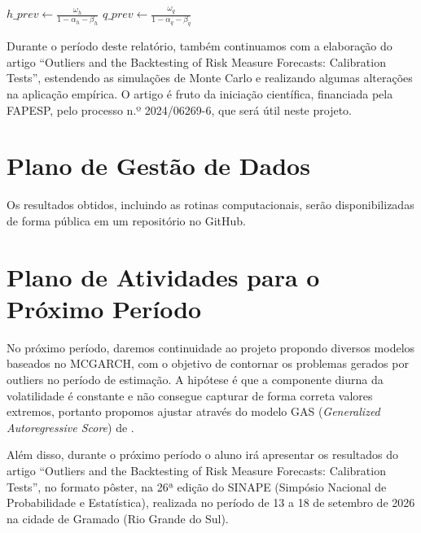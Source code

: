 \documentclass{article}
\begin{document}
\begin{algorithm}
\caption{Simulador de retornos intradiários pelo modelo MCGARCH.}\label{alg:mcgarch_sim}
$h\_prev \gets \frac{\omega_{h}}{1 - \alpha_{h} - \beta_{h}}$\;
$q\_prev \gets \frac{\omega_{q}}{1 - \alpha_{q} - \beta_{q}}$\;

\end{algorithm}

Durante o período deste relatório, também continuamos com a elaboração do artigo ``Outliers and the Backtesting of Risk Measure Forecasts: Calibration Tests'', estendendo as simulações de Monte Carlo e realizando algumas alterações na aplicação empírica. O artigo é fruto da iniciação científica, financiada pela FAPESP, pelo processo n.º 2024/06269-6, que será útil neste projeto.




\section{Plano de Gestão de Dados}
Os resultados obtidos, incluindo as rotinas computacionais, serão disponibilizadas de forma pública em um repositório no GitHub.



\section{Plano de Atividades para o Próximo Período}
No próximo período, daremos continuidade ao projeto propondo diversos modelos baseados no MCGARCH, com o objetivo de contornar os problemas gerados por outliers no período de estimação. A hipótese é que a componente diurna da volatilidade é constante e não consegue capturar de forma correta valores extremos, portanto propomos ajustar através do modelo GAS (\textit{Generalized Autoregressive Score}) de \citet{Creal_Koopman_Lucas_2008}.

Além disso, durante o próximo período o aluno irá apresentar os resultados do artigo ``Outliers and the Backtesting of Risk Measure Forecasts: Calibration Tests'', no formato pôster, na 26ª edição do SINAPE (Simpósio Nacional de Probabilidade e Estatística), realizada no período de 13 a 18 de setembro de 2026 na cidade de Gramado (Rio Grande do Sul).




\printbibliography
\end{document}
